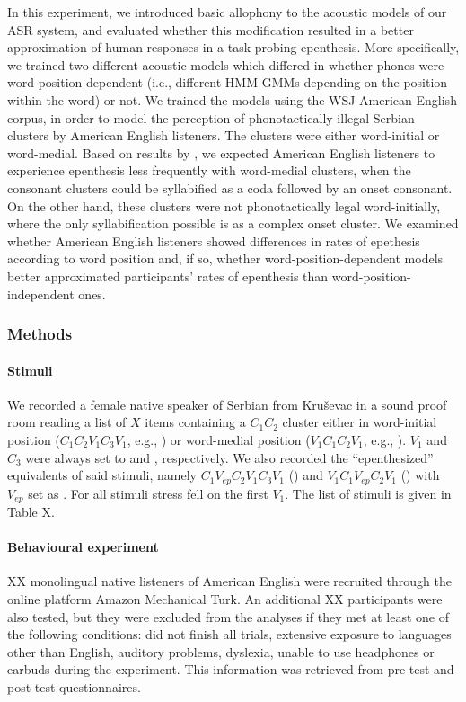 {In this experiment, we introduced basic allophony to the acoustic models of our ASR system, and evaluated whether this modification resulted in a better approximation of human responses in a task probing epenthesis. More specifically, we trained two different acoustic models which differed in whether phones were word-position-dependent (i.e., different HMM-GMMs depending on the position within the word) or not. We trained the models using the WSJ American English corpus, in order to model the perception of phonotactically illegal Serbian clusters by American English listeners. The clusters were either word-initial or word-medial. Based on results by \cite{kabak2007}, we expected American English listeners to experience epenthesis less frequently with word-medial clusters, when the consonant clusters could be syllabified as a coda followed by an onset consonant. On the other hand, these clusters were not phonotactically legal word-initially, where the only syllabification possible is as a complex onset cluster. We examined whether American English listeners showed differences in rates of epethesis according to word position and, if so, whether word-position-dependent models better approximated participants' rates of epenthesis than word-position-independent ones.         

\subsubsection{Methods}
\paragraph{Stimuli}
We recorded a female native speaker of Serbian from Kruševac in a sound proof room reading a list of {\color{red}$X$} items containing a $C_{1}C_{2}$ cluster either in word-initial position ($C_{1}C_{2}V_{1}C_{3}V_{1}$, e.g., ) or word-medial position ($V_{1}C_{1}C_{2}V_{1}$, e.g., ). $V_{1}$ and $C_{3}$ were always set to  and , respectively. 
We also recorded the ``epenthesized'' equivalents of said stimuli, namely $C_{1}V_{ep}C_{2}V_{1}C_{3}V_{1}$ () and $V_{1}C_{1}V_{ep}C_{2}V_{1}$ () with $V_{ep}$ set as \textipa{[@]}.
For all stimuli stress fell on the first $V_{1}$.
{\color{red}The list of stimuli is given in Table X.}

\paragraph{Behavioural experiment}
{\color{red}XX} monolingual native listeners of American English were recruited through the online platform Amazon Mechanical Turk. An additional {\color{red}XX participants were also tested, but they were excluded from the analyses if they met at least one of the following conditions: did not finish all trials, extensive exposure to languages other than English, auditory problems, dyslexia, unable to use headphones or earbuds during the experiment}. This information was retrieved from pre-test and post-test questionnaires.

}
